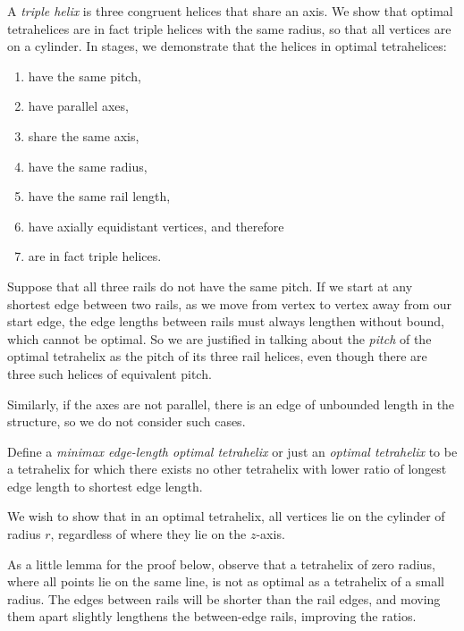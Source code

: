 \documentclass[twocolumn,10pt]{asme2ej}
\begin{document}
A \emph{triple helix} is three congruent helices that share an axis. We show that
optimal tetrahelices are in fact triple helices with the same radius, so that all
vertices are on a cylinder. In stages, we demonstrate that the helices in optimal tetrahelices:
\begin{enumerate}
\item have the same pitch,
\item have parallel axes,
\item share the same axis,
\item have the same radius,
  \item have the same rail length,
  \item have axially equidistant vertices, and therefore
  \item are in fact triple helices.
\end{enumerate}

Suppose that all three rails do not have the same pitch. If we start at any shortest edge between
two rails, as we move
from vertex to vertex away from our start edge, the edge lengths
between rails must always lengthen without bound,
which cannot be optimal.
So we are justified in talking about the
\emph{pitch} of 
the optimal tetrahelix as the pitch of its three rail helices, even though there are
three such helices of equivalent pitch.

Similarly, if the axes are not parallel, there is an edge of
unbounded length in the structure, so we do not consider such cases.

Define a \emph{minimax edge-length optimal tetrahelix} or just an
\emph{optimal tetrahelix} to be a tetrahelix for which there exists
no other tetrahelix with lower ratio of longest edge length to shortest edge length.

We wish to show that in an optimal tetrahelix, all vertices lie on the cylinder
of radius $r$, regardless of where they lie on the $z$-axis.

As a little lemma for the proof below, observe that a tetrahelix of zero radius, where
all points lie on the same line,
is not as optimal as a tetrahelix of a small radius. The edges between rails will be
shorter than the rail edges, and moving them apart slightly lengthens the between-edge
rails, improving the ratios.
\end{document}
